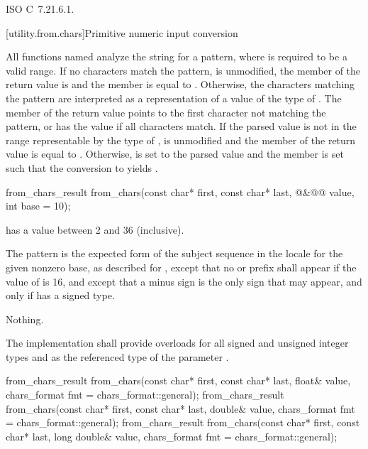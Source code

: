 \xref ISO C~7.21.6.1.

[utility.from.chars]{Primitive numeric input conversion}

\pnum
All functions named 
analyze the string 
for a pattern,
where  is required to be a valid range.
If no characters match the pattern,
 is unmodified,
the member  of the return value is  and
the member  is equal to .
Otherwise,
the characters matching the pattern
are interpreted as a representation
of a value of the type of .
The member 
of the return value
points to the first character
not matching the pattern,
or has the value 
if all characters match.
If the parsed value
is not in the range
representable by the type of ,
 is unmodified and
the member  of the return value
is equal to .
Otherwise,
 is set to the parsed value and
the member  is set
such that the conversion to  yields .

%
\begin{itemdecl}
from_chars_result from_chars(const char* first, const char* last,
                             @\seebelow@&@\itcorr[-1]@ value, int base = 10);
\end{itemdecl}

\begin{itemdescr}
\pnum
\requires {} has a value between 2 and 36 (inclusive).

\pnum
\effects The pattern is the expected form of the subject sequence
in the  locale
for the given nonzero base,
as described for ,
except that no  or  prefix shall appear
if the value of  is 16,
and except that a minus sign
is the only sign that may appear,
and only if  has a signed type.

\pnum
\throws Nothing.

\pnum
\remarks
The implementation shall provide overloads
for all signed and unsigned integer types
and 
as the referenced type of the parameter .
\end{itemdescr}

%
\begin{itemdecl}
from_chars_result from_chars(const char* first, const char* last, float& value,
                             chars_format fmt = chars_format::general);
from_chars_result from_chars(const char* first, const char* last, double& value,
                             chars_format fmt = chars_format::general);
from_chars_result from_chars(const char* first, const char* last, long double& value,
                             chars_format fmt = chars_format::general);
\end{itemdecl}

